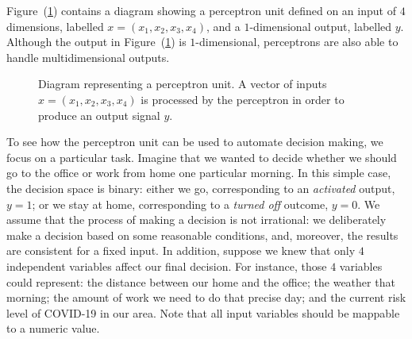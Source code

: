 Figure~(\ref{fig:neural_networks/perceptron}) contains a diagram showing a perceptron unit defined on an input
of $4$ dimensions, labelled $x = (x_1, x_2, x_3, x_4)$, and a $1$-dimensional output, labelled $y$. Although
the output in Figure~(\ref{fig:neural_networks/perceptron}) is $1$-dimensional, perceptrons are also able to
handle multidimensional outputs.

\begin{figure}[H]
	\caption{
        Diagram representing a perceptron unit. A vector of inputs $x = (x_1, x_2, x_3, x_4)$ is
        processed by the perceptron in order to produce an output signal $y$.
    }\label{fig:neural_networks/perceptron}
	\centering
\end{figure}

To see how the perceptron unit can be used to automate decision making, we focus on a particular task. Imagine
that we wanted to decide whether we should go to the office or work from home one particular morning. In this
simple case, the decision space is binary: either we go, corresponding to an \textit{activated} output, $y =
1$; or we stay at home, corresponding to a \textit{turned off} outcome, $y = 0$. We assume that the process of
making a decision is not irrational: we deliberately make a decision based on some reasonable conditions, and,
moreover, the results are consistent for a fixed input. In addition, suppose we knew that only $4$ independent
variables affect our final decision. For instance, those $4$ variables could represent: the distance between
our home and the office; the weather that morning; the amount of work we need to do that precise day; and the
current risk level of COVID-19 in our area. Note that all input variables should be mappable to a numeric
value.

